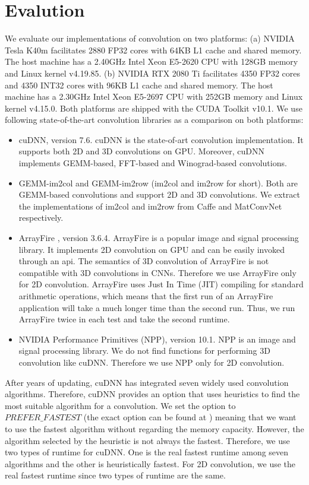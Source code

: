 \section{Evalution}
\label{exp}
We evaluate our implementations of convolution on two platforms: (a) NVIDIA Tesla K40m facilitates 2880 FP32 cores with 64KB L1 cache and
shared memory. The host machine has a 2.40GHz Intel Xeon E5-2620 CPU with 128GB memory and Linux kernel v4.19.85. (b) NVIDIA RTX 2080 Ti
facilitates 4350 FP32 cores and 4350 INT32 cores with 96KB L1 cache and shared memory. The host machine has a 2.30GHz Intel Xeon E5-2697
CPU with 252GB memory and Linux kernel v4.15.0. Both platforms are shipped with the CUDA Toolkit v10.1. We use following state-of-the-art
convolution libraries as a comparison on both platforms:
\begin{itemize}
  \item cuDNN, version 7.6. cuDNN is the state-of-art convolution implementation. It supports both 2D and 3D convolutions on GPU.
      Moreover, cuDNN implements GEMM-based, FFT-based and Winograd-based convolutions.
  \item GEMM-im2col and GEMM-im2row (im2col and im2row for short). Both are GEMM-based convolutions and support 2D and 3D convolutions.
      We extract the implementations of im2col and im2row from Caffe \cite{jia2014caffe} and MatConvNet \cite{vedaldi15matconvnet}
      respectively.
  \item ArrayFire \cite{Yalamanchili2015}, version 3.6.4. ArrayFire is a popular image and signal processing library. It implements 2D
      convolution on GPU and can be easily invoked through an api. The semantics of 3D convolution of ArrayFire is not compatible with 3D
      convolutions in CNNs. Therefore we use ArrayFire only for 2D convolution. ArrayFire uses Just In Time (JIT) compiling for standard
      arithmetic operations, which means that the first run of an ArrayFire application will take a much longer time than the second run.
      Thus, we run ArrayFire twice in each test and take the second runtime.
  \item NVIDIA Performance Primitives (NPP), version 10.1. NPP is an image and signal processing library. We do not find functions for
      performing 3D convolution like cuDNN. Therefore we use NPP only for 2D convolution.

\end{itemize}

After years of updating, cuDNN has integrated seven widely used convolution algorithms. Therefore, cuDNN provides an option that uses
heuristics to find the most suitable algorithm for a convolution. We set the option to $PREFER\_FASTEST$ (the exact option can be found at
\cite{CUDAtoolkit}) meaning that we want to use the fastest algorithm without regarding the memory capacity. However, the algorithm
selected by the heuristic is not always the fastest. Therefore, we use two types of runtime for cuDNN. One is the real fastest runtime
among seven algorithms and the other is heuristically fastest. For 2D convolution, we use the real fastest runtime since two types of
runtime are the same.

